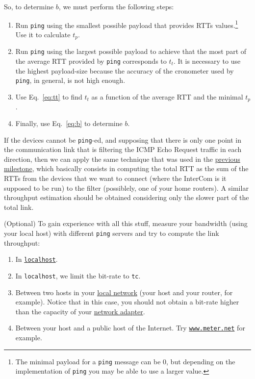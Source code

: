 So, to determine $b$, we must perform the following steps:
\begin{enumerate}
\item Run \texttt{ping} using the smallest possible payload that
  provides RTTs values.\footnote{The minimal payload for a
    \texttt{ping} message can be 0, but depending on the
    implementation of \texttt{ping} you may be able to use a larger
    value.} Use it to calculate $t_p$.
  
\item Run \texttt{ping} using the largest possible payload to achieve
  that the most part of the average RTT provided by \texttt{ping}
  corresponds to $t_t$. It is necessary to use the highest
  payload-size because the accuracy of the cronometer used by
  \texttt{ping}, in general, is not high enough.
  
\item Use Eq.~\eqref{eq:tt} to find $t_t$ as a function of the average
  RTT and the minimal $t_p$.
  
\item Finally, use Eq.~\eqref{eq:b} to determine $b$.
\end{enumerate}

If the devices cannot be \texttt{ping}-ed, and supposing that there is
only one point in the communication link that is filtering the ICMP
Echo Request traffic in each direction, then we can apply the same
technique that was used in the
\href{https://tecnologias-multimedia.github.io/study_guide/latency/}{previous
  milestone}, which basically consists in computing the total RTT as
the sum of the RTTs from the devices that we want to connect (where
the InterCom is it supposed to be run) to the filter (possiblely, one
of your home routers). A similar throughput estimation should be
obtained considering only the slower part of the total link.

(Optional) To gain experience with all this stuff, measure
your bandwidth (using your local host) with different \texttt{ping}
servers and try to compute the link throughput:
\begin{enumerate}
\item In \href{https://en.wikipedia.org/wiki/Localhost}{\texttt{localhost}}.
\item In \texttt{localhost}, we limit the bit-rate to \texttt{tc}.
\item Between two hosts in your
  \href{https://en.wikipedia.org/wiki/Local_area_network}{local
    network} (your host and your router, for example). Notice that in
  this case, you should not obtain a bit-rate higher than the capacity
  of your
  \href{https://en.wikipedia.org/wiki/Network_interface_controller}{network
    adapter}.
\item Between your host and a public host of the Internet. Try
  \href{https://www.meter.net/}{\texttt{www.meter.net}} for example.
\end{enumerate}

